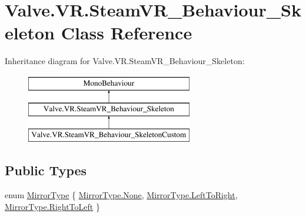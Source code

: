 \hypertarget{class_valve_1_1_v_r_1_1_steam_v_r___behaviour___skeleton}{}\section{Valve.\+V\+R.\+Steam\+V\+R\+\_\+\+Behaviour\+\_\+\+Skeleton Class Reference}
\label{class_valve_1_1_v_r_1_1_steam_v_r___behaviour___skeleton}
Inheritance diagram for Valve.\+V\+R.\+Steam\+V\+R\+\_\+\+Behaviour\+\_\+\+Skeleton\+:\begin{figure}[H]
\begin{center}
\leavevmode
\includegraphics[height=3.000000cm]{class_valve_1_1_v_r_1_1_steam_v_r___behaviour___skeleton}
\end{center}
\end{figure}
\subsection*{Public Types}
\begin{DoxyCompactItemize}
\item 
enum \mbox{\hyperlink{class_valve_1_1_v_r_1_1_steam_v_r___behaviour___skeleton_a3188d8ae0638290912932d7ae16b4a02}{Mirror\+Type}} \{ \mbox{\hyperlink{class_valve_1_1_v_r_1_1_steam_v_r___behaviour___skeleton_a3188d8ae0638290912932d7ae16b4a02a6adf97f83acf6453d4a6a4b1070f3754}{Mirror\+Type.\+None}}, 
\mbox{\hyperlink{class_valve_1_1_v_r_1_1_steam_v_r___behaviour___skeleton_a3188d8ae0638290912932d7ae16b4a02ad1e80c506f4c89e3c4fb1c1b4867a03c}{Mirror\+Type.\+Left\+To\+Right}}, 
\mbox{\hyperlink{class_valve_1_1_v_r_1_1_steam_v_r___behaviour___skeleton_a3188d8ae0638290912932d7ae16b4a02ab7b0ea3028791689ea070674776855e2}{Mirror\+Type.\+Right\+To\+Left}}
 \}
\end{DoxyCompactItemize}
